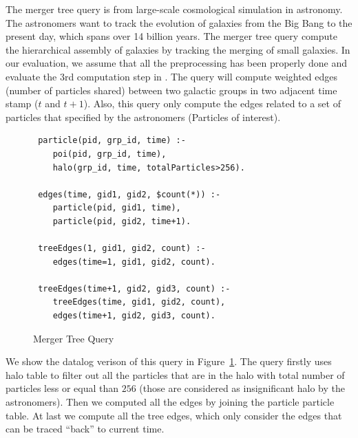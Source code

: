 The merger tree query is from large-scale cosmological simulation in astronomy.
The astronomers want to track the evolution of galaxies from the Big Bang
to the present day, which spans over 14 billion years. The merger tree query 
compute the hierarchical assembly of galaxies by tracking the merging of 
small galaxies. In our evaluation, we assume that all the preprocessing has
been properly done and evaluate the 3rd computation step
 in \cite{LoebmanOCOAHBQG14SIGMOD}. The query will compute weighted edges
 (number of particles shared) between two galactic groups in two adjacent time
 stamp ($t$ and $t+1$). Also, this query only compute the edges related to a 
 set of particles that specified by the astronomers (Particles of interest).

 \begin{figure}[t]
 \begin{verbatim}
 particle(pid, grp_id, time) :- 
    poi(pid, grp_id, time), 
    halo(grp_id, time, totalParticles>256).
 
 edges(time, gid1, gid2, $count(*)) :-
    particle(pid, gid1, time), 
    particle(pid, gid2, time+1).
 
 treeEdges(1, gid1, gid2, count) :- 
    edges(time=1, gid1, gid2, count).

 treeEdges(time+1, gid2, gid3, count) :-
    treeEdges(time, gid1, gid2, count), 
    edges(time+1, gid2, gid3, count). 
 \end{verbatim}
 \caption{Merger Tree Query}
 \label{fig:merger-tree}
 \end{figure}

We show the datalog verison of this query in Figure~\ref{fig:merger-tree}. 
The query firstly uses halo table to filter out all the particles that are 
in the halo with total number of particles less or equal than $256$ 
(those are considered as insignificant halo by the astronomers). 
Then we computed all the edges by joining the particle particle table.
At last we compute all the tree edges, which only consider the edges that can
be traced ``back'' to current time. 
